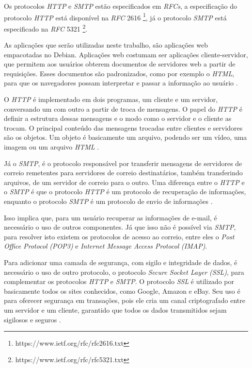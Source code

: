 Os protocolos \textit{HTTP} e \textit{SMTP} estão especificados em \textit{RFCs}, a 
especificação do protocolo \textit{HTTP} está disponível na \textit{RFC} 2616 
\footnote{https://www.ietf.org/rfc/rfc2616.txt}, já o protocolo \textit{SMTP} 
está especificado na \textit{RFC} 5321 \footnote{https://www.ietf.org/rfc/rfc5321.txt}.

As aplicações que serão utilizadas neste trabalho, são aplicações web empacotadas no
Debian. Aplicações web costumam ser aplicações cliente-servidor, que permitem aos
usuários obterem documentos de servidores web a partir de requisições. Esses documentos são padronizados, como por exemplo o \textit{HTML}, 
para que os navegadores possam interpretar e passar a informação ao usuário 
\cite{kurose2010redes}.

O \textit{HTTP} é 
implementado em dois programas, um cliente e um servidor, conversando um 
com outro a partir de troca de mensagens. O papel do \textit{HTTP} é definir a 
estrutura dessas mensagens e o modo como o servidor e o cliente as trocam. O 
principal conteúdo das mensagens trocadas entre clientes e servidores são os 
objetos. Um objeto é basicamente um arquivo, podendo ser um vídeo, uma imagem 
ou um arquivo \textit{HTML} \cite{kurose2010redes}.

Já o \textit{SMTP}, é o protocolo responsável por transferir mensagens de servidores de correio
remetentes para servidores de correio destinatários, também transferindo arquivos,
de um servidor de correio para o outro. Uma diferença entre o \textit{HTTP} e o \textit{SMTP}
é que o protocolo \textit{HTTP} é um protocolo de recuperação de informações, enquanto
o protocolo \textit{SMTP} é um protocolo de envio de informações \cite{kurose2010redes}. 

Isso implica que, para um usuário recuperar as informações de e-mail, é necessário 
o uso de outros componentes. Já que isso não é possível via \textit{SMTP}, para 
resolver isto existem os protocolos de acesso ao correio, entre eles o 
\textit{Post Office Protocol} \textit{(POP3)} e \textit{Internet Message Access Protocol} \textit{(IMAP)}.

Para adicionar uma camada de segurança, com sigilo e integridade de dados, é necessário
o uso de outro protocolo, o protocolo \textit{Secure Socket Layer} \textit{(SSL)}, para 
complementar os protocolos \textit{HTTP} e \textit{SMTP}. O protocolo \textit{SSL} 
é utilizado por basicamente todos os sites conhecidos, como Google,
Amazon e eBay. Seu uso é para oferecer segurança em transações, pois ele cria um
canal criptografado entre um servidor e um cliente, garantido que todos os
dados transmitidos sejam sigilosos e seguros \cite{kurose2010redes}. 

